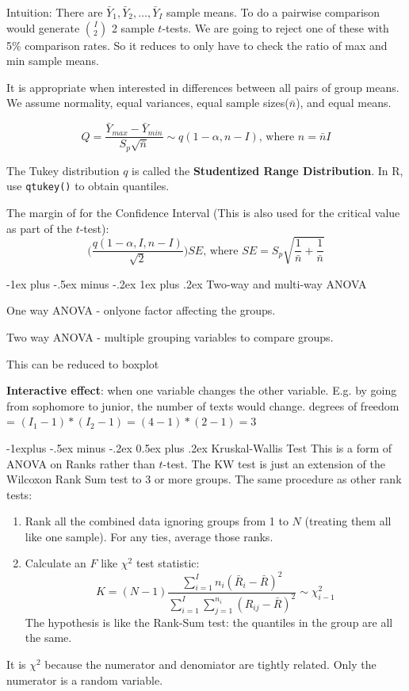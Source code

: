 \documentclass[10pt,landscape]{article}
\makeatletter
\renewcommand{\subsection}{\@startsection{subsection}{2}{0mm}%
                                {-1explus -.5ex minus -.2ex}%
                                {0.5ex plus .2ex}%
                                {\normalfont\normalsize\bfseries}}
\renewcommand{\subsubsection}{\@startsection{subsubsection}{3}{0mm}%
                                {-1ex plus -.5ex minus -.2ex}%
                                {1ex plus .2ex}%
                                {\normalfont\small\bfseries}}
\makeatother
\begin{document}
\begin{multicols*}{3}
Intuition: There are $\bar{Y}_1, \bar{Y}_2, \ldots, \bar{Y}_I$ sample means. To do a pairwise comparison
would generate ${I \choose 2}$ 2 sample $t$-tests. We are going to reject one of these with 5\% comparison
rates. So it reduces to only have to check the ratio of max and min sample means.

It is appropriate when interested in differences between all pairs of group
means. We assume normality, equal variances, equal sample sizes($\bar{n}$), and equal means.

\[
Q = \frac{\bar{Y}_{max} - \bar{Y}_{min}}  {S_p \sqrt{ \bar{n}}} \sim q(1 - \alpha, n-I) \text{, where } n = \bar{n}I
\]

The Tukey distribution $q$ is called the \textbf{Studentized Range Distribution}. In R, use \texttt{qtukey()} to obtain quantiles.

The margin of for the Confidence Interval (This is also used for the critical value as part of the $t$-test):
\[
\bigg(\frac{q(1-\alpha,I,n-I) } {\sqrt{2} }    \bigg) SE \text{, where }SE = S_p \sqrt{\frac{1}{\bar{n}} + \frac{1}{\bar{n}} }
\]




\subsubsection{Two-way and multi-way ANOVA}

One way ANOVA - onlyone factor affecting the groups.

Two way ANOVA - multiple grouping variables to compare groups.

This can be reduced to boxplot

\textbf{Interactive effect}: when one variable changes the other variable. E.g. by going from
sophomore to junior, the number of texts would change.  degrees of freedom = $(I_1 -1)*(I_2  -1 ) = (4-1)*(2-1) = 3$

\subsection{Kruskal-Wallis Test}
This is a form of ANOVA on Ranks rather than $t$-test. The KW test is just an extension of the Wilcoxon Rank Sum test to 3 or more groups. The same procedure as other rank tests:

\begin{enumerate}
\item Rank all the combined data ignoring groups from 1 to $N$ (treating them all like one sample).
For any ties, average those ranks.
\item Calculate an $F$ like $\chi^2$ test statistic:
\[
K = (N -1) \frac {\sum_{i=1}^I n_i (\bar{R}_i - \bar{R})^2 }  
			{ \sum_{i=1}^I\sum_{j=1}^{n_i} (R_{ij} - \bar{R})^2    } \sim \chi^2_{i-1}
\]
The hypothesis is like the Rank-Sum test: the quantiles in the group are all the same.
\end{enumerate} It is $\chi^2$ because the numerator and denomiator are tightly related. Only the numerator is a random 
variable.


\scriptsize


\end{multicols*}
\end{document}
